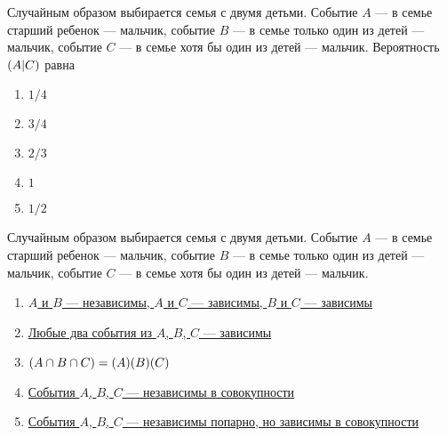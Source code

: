 \documentclass[t]{beamer}
\let\P\relax
\DeclareMathOperator{\P}{\mathbb{P}}
\begin{document}
 \begin{frame} \label{3} 
\begin{block}{3} 

Случайным образом выбирается семья с двумя детьми. Событие $A$ — в семье старший ребенок — мальчик,  событие $B$ — в семье только один из детей — мальчик, событие $C$ — в семье хотя бы один из детей — мальчик.  Вероятность $\P(A | C)$ равна
   


 \end{block} 
\begin{enumerate} 
\item[] \hyperlink{3-No}{\beamergotobutton{} $1/4$}
\item[] \hyperlink{3-No}{\beamergotobutton{} $3/4$
}
\item[] \hyperlink{3-Yes}{\beamergotobutton{} $2/3$}
\item[] \hyperlink{3-No}{\beamergotobutton{} $1$}
\item[] \hyperlink{3-No}{\beamergotobutton{} $1/2$}
\end{enumerate} 
\end{frame} 


 \begin{frame} \label{4} 
\begin{block}{4} 

Случайным образом выбирается семья с двумя детьми. Событие $A$ — в семье старший ребенок — мальчик,  событие $B$ — в семье только один из детей — мальчик, событие $C$ — в семье хотя бы один из детей — мальчик.


 \end{block} 
\begin{enumerate} 
\item[] \hyperlink{4-Yes}{\beamergotobutton{} $A$ и $B$ — независимы, $A$ и $C$ — зависимы, $B$ и $C$ — зависимы}
\item[] \hyperlink{4-No}{\beamergotobutton{} Любые два события из $A$, $B$, $C$ — зависимы}
\item[] \hyperlink{4-No}{\beamergotobutton{} $\P(A\cap B\cap C)=\P(A)\P(B)\P(C)$
}
\item[] \hyperlink{4-No}{\beamergotobutton{} События $A$, $B$, $C$ — независимы в совокупности}
\item[] \hyperlink{4-No}{\beamergotobutton{} События $A$, $B$, $C$ — независимы попарно, но зависимы в совокупности}
\end{enumerate} 
\end{frame} 
\end{document}
